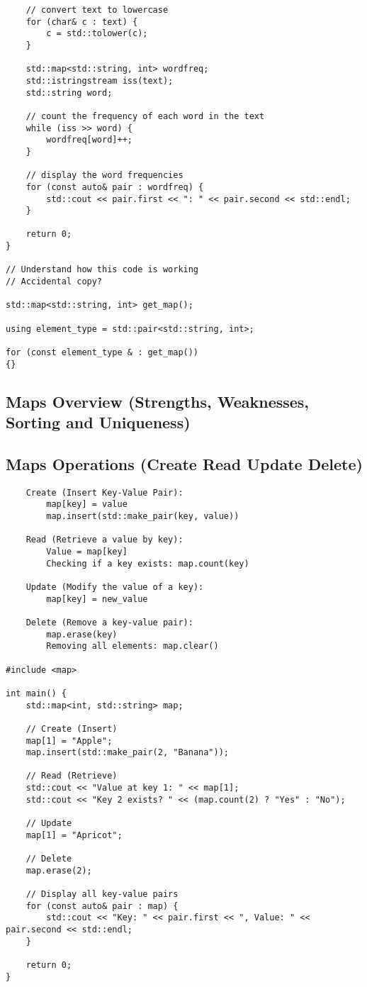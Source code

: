 \begin{verbatim}
    // convert text to lowercase
    for (char& c : text) {
        c = std::tolower(c);
    }

    std::map<std::string, int> wordfreq;
    std::istringstream iss(text);
    std::string word;

    // count the frequency of each word in the text
    while (iss >> word) {
        wordfreq[word]++;
    }

    // display the word frequencies
    for (const auto& pair : wordfreq) {
        std::cout << pair.first << ": " << pair.second << std::endl;
    }

    return 0;
}

// Understand how this code is working
// Accidental copy?

std::map<std::string, int> get_map();

using element_type = std::pair<std::string, int>;

for (const element_type & : get_map())
{}
\end{verbatim}

 
\subsection{Maps Overview (Strengths, Weaknesses, Sorting and Uniqueness)}

\subsection{Maps Operations (Create Read Update Delete)}

\begin{verbatim}
    Create (Insert Key-Value Pair):
        map[key] = value 
        map.insert(std::make_pair(key, value))

    Read (Retrieve a value by key):
        Value = map[key]
        Checking if a key exists: map.count(key)

    Update (Modify the value of a key):
        map[key] = new_value

    Delete (Remove a key-value pair):
        map.erase(key)
        Removing all elements: map.clear()

#include <map>

int main() {
    std::map<int, std::string> map;

    // Create (Insert)
    map[1] = "Apple";
    map.insert(std::make_pair(2, "Banana"));

    // Read (Retrieve)
    std::cout << "Value at key 1: " << map[1];
    std::cout << "Key 2 exists? " << (map.count(2) ? "Yes" : "No");

    // Update
    map[1] = "Apricot";

    // Delete
    map.erase(2);

    // Display all key-value pairs
    for (const auto& pair : map) {
        std::cout << "Key: " << pair.first << ", Value: " << pair.second << std::endl;
    }

    return 0;
}
\end{verbatim}

